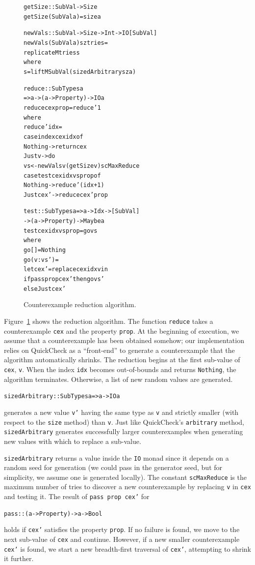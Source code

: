 \documentclass[10pt]{sigplanconf}
\newenvironment{code}{\begin{alltt}}{\end{alltt}}
\newcommand{\ttp}[1]{\texttt{#1}}
\begin{document}
\begin{figure}[ht]
  \begin{code}
getSize :: SubVal -> Size
getSize (SubVal a) = size a

newVals :: SubVal -> Size -> Int -> IO [SubVal]
newVals (SubVal a) sz tries =
  replicateM tries s
  where
  s  = liftM SubVal (sizedArbitrary sz a)

reduce :: SubTypes a
       => a -> (a -> Property) -> IO a
reduce cex prop = reduce' 1
  where
  reduce' idx =
    case index cex idx of
      Nothing -> return cex
      Just v  -> do
        vs <- newVals v (getSize v) scMaxReduce
        case test cex idx vs prop of
          Nothing   -> reduce' (idx+1)
          Just cex' -> reduce cex' prop

test :: SubTypes a => a -> Idx -> [SubVal]
     -> (a -> Property) -> Maybe a
test cex idx vs prop = go vs
  where
  go []      = Nothing
  go (v:vs') =
    let cex' = replace cex idx v in
    if pass prop cex' then go vs'
      else Just cex'
  \end{code}
  \caption{Counterexample reduction algorithm.\label{fig:reduction}}
\end{figure}

Figure~\ref{fig:reduction} shows the reduction algorithm.  The function
\ttp{reduce} takes a counterexample \ttp{cex} and the property \ttp{prop}.  At
the beginning of execution, we assume that a counterexample has been obtained
somehow; our implementation relies on QuickCheck as a ``front-end'' to generate
a counterexample that the algorithm automatically shrinks.  The reduction begins
at the first sub-value of \ttp{cex}, \ttp{v}.  When the index \ttp{idx} becomes
out-of-bounds and returns \ttp{Nothing}, the algorithm terminates.  Otherwise, a
list of new random values are generated.
%
\begin{code}
sizedArbitrary :: SubTypes a => a -> IO a
\end{code}
%
\noindent
generates a new value \ttp{v'} having the same type as \ttp{v} and strictly
smaller (with respect to the \ttp{size} method) than \ttp{v}.  Just like
QuickCheck's \ttp{arbitrary} method, \ttp{sizedArbitrary} generates successfully
larger counterexamples when generating new values with which to replace a
sub-value.


\ttp{sizedArbitrary} returns a value inside the \ttp{IO} monad since it depends
on a random seed for generation (we could pass in the generator seed, but for
simplicity, we assume one is generated locally).  The constant \ttp{scMaxReduce} is
the maximum number of tries to discover a new counterexample by replacing
\ttp{v} in \ttp{cex} and testing it.  The result of \ttp{pass prop cex'} for
%
\begin{code}
pass :: (a -> Property) -> a -> Bool
\end{code}
%
\noindent
holds if \ttp{cex'} satisfies the property \ttp{prop}.  If no failure is found,
we move to the next sub-value of \ttp{cex} and continue.  However, if a new
smaller counterexample \ttp{cex'} is found, we start a new breadth-first
traversal of \ttp{cex'}, attempting to shrink it further.
\end{document}
